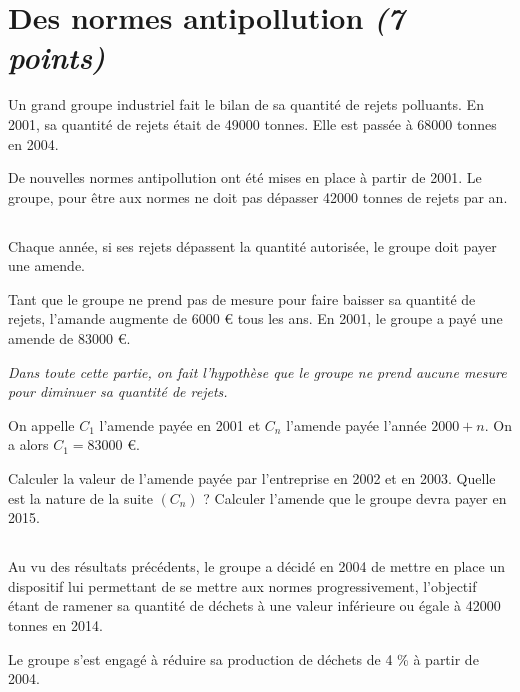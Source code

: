 \section{Des normes antipollution \textit{(7 points)}}

Un grand groupe industriel fait le bilan de sa quantité de rejets polluants. En 2001, sa quantité de rejets était de \num{49000} tonnes. Elle est passée à \num{68000} tonnes en 2004.


De nouvelles normes antipollution ont été mises en place à partir de 2001. Le groupe, pour être aux normes ne doit pas dépasser \num{42000} tonnes de rejets par an.

\subsection{}
Chaque année, si ses rejets dépassent la quantité autorisée, le groupe doit payer une amende.

Tant que le groupe ne prend pas de mesure pour faire baisser sa quantité de rejets, l'amande augmente de \num{6000} € tous les ans. En 2001, le groupe a payé une amende de \num{83000} €.

\textit{Dans toute cette partie, on fait l'hypothèse que le groupe ne prend aucune mesure pour diminuer sa quantité de rejets.}

On appelle $C_1$ l'amende payée en 2001 et $C_n$ l'amende payée l'année $2000 + n$. On a alors $C_1 = \num{83000}$ €.\\

\begin{questions}
	\question[1] Calculer la valeur de l'amende payée par l'entreprise en 2002 et en 2003.
	\question[1] Quelle est la nature de la suite $(C_n)$ ?
	\question[1] Calculer l'amende que le groupe devra payer en 2015.
\end{questions}

\subsection{}

Au vu des résultats précédents, le groupe a décidé en 2004 de mettre en place un dispositif lui permettant de se mettre aux normes progressivement, l'objectif étant de ramener sa quantité de déchets à une valeur inférieure ou égale à \num{42000} tonnes en 2014.

Le groupe s'est engagé à réduire sa production de déchets de 4 \% à partir de 2004.\\

